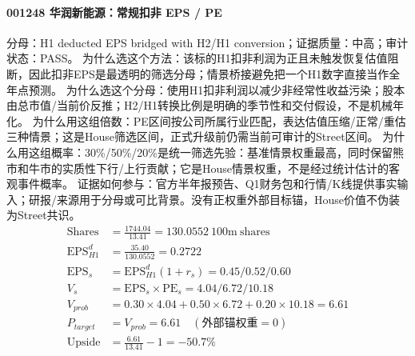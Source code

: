 \paragraph{001248 华润新能源：常规扣非 EPS / PE}
分母：H1 deducted EPS bridged with H2/H1 conversion；证据质量：中高；审计状态：PASS。
为什么选这个方法：该标的H1扣非利润为正且未触发恢复估值阻断，因此扣非EPS是最透明的筛选分母；情景桥接避免把一个H1数字直接当作全年点预测。
为什么选这个分母：使用H1扣非利润以减少非经常性收益污染；股本由总市值/当前价反推；H2/H1转换比例是明确的季节性和交付假设，不是机械年化。
为什么用这组倍数：PE区间按公司所属行业匹配，表达估值压缩/正常/重估三种情景；这是House筛选区间，正式升级前仍需当前可审计的Street区间。
为什么用这组概率：30\%/50\%/20\%是统一筛选先验：基准情景权重最高，同时保留熊市和牛市的实质性下行/上行贡献；它是House情景权重，不是经过统计估计的客观事件概率。
证据如何参与：官方半年报预告、Q1财务包和行情/K线提供事实输入；研报/来源用于分母或可比背景。没有正权重外部目标锚，House价值不伪装为Street共识。
\begin{align*}
\mathrm{Shares} &= \frac{1744.04}{13.41}=130.0552\ \mathrm{100m\ shares}\\
\mathrm{EPS}_{H1}^d &= \frac{35.40}{130.0552}=0.2722\\
\mathrm{EPS}_s &= \mathrm{EPS}_{H1}^d(1+r_s)=0.45/0.52/0.60\\
V_s &= \mathrm{EPS}_s\times \mathrm{PE}_s=4.04/6.72/10.18\\
V_{prob} &= 0.30\times 4.04+0.50\times 6.72+0.20\times 10.18=6.61\\
P_{target} &= V_{prob}=6.61\quad(\text{外部锚权重}=0)\\
\mathrm{Upside} &= \frac{6.61}{13.41}-1=-50.7\%\\
\end{align*}

